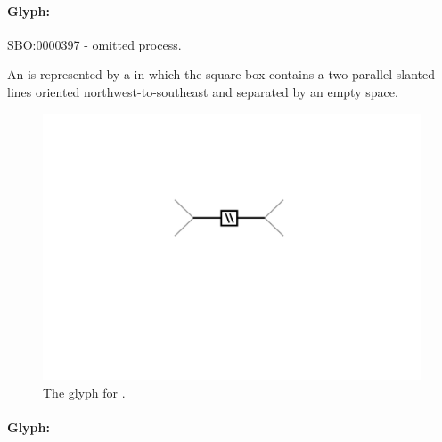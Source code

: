 
\paragraph{Glyph: }\label{sec:techref:omitted}


\begin{glyphDescription}
 \glyphSboTerm SBO:0000397 - omitted process.

 \glyphNode An  is represented by a  in which the square box contains a two parallel slanted lines oriented northwest-to-southeast and separated by an empty space.
 \end{glyphDescription}

\begin{figure}[htb]
  \centering
  \includegraphics[scale = 0.5]{images/omitted}
  \caption{The \PD glyph for .}
  \label{fig:techref:omitted}
\end{figure}



\paragraph{Glyph: }\label{sec:techref:uncertain}

